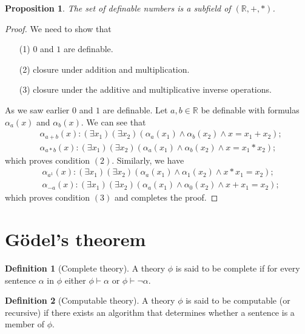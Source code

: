 \documentclass[11pt,a4paper]{article}
\theoremstyle{definition}
\newtheorem{definition}{Definition}[section]
\theoremstyle{plain}
\newtheorem{proposition}[theorem]{Proposition}
\newcommand{\R}{\mathbb{R}}
\begin{document}
  \begin{proposition}
    The set of definable numbers is a subfield of $(\R,+,*)$.
  \end{proposition}
  \begin{proof}
    We need to show that
    \begin{enumerate}
      \item[(1)] $0$ and $1$ are definable.
      \item[(2)] closure under addition and multiplication.
      \item[(3)] closure under the additive and multiplicative 
        inverse operations.
    \end{enumerate}
    As we saw earlier $0$ and $1$ are definable. Let $a,b \in \R$ be definable
    with formulas $\alpha_a(x)$ and $\alpha_b(x)$. We can see that
    \begin{align*}
      &\alpha_{a+b}(x) \colon (\exists x_1)(\exists x_2)
        (\alpha_a(x_1) \land \alpha_b(x_2) \land x = x_1 + x_2); \\
      &\alpha_{a*b}(x) \colon (\exists x_1)(\exists x_2)
        (\alpha_a(x_1) \land \alpha_b(x_2) \land x = x_1 * x_2);
    \end{align*}
    which proves condition $(2)$.
    Similarly, we have
    \begin{align*}
      &\alpha_{a^{1}}(x) \colon (\exists x_1)(\exists x_2)
        (\alpha_a(x_1) \land \alpha_1(x_2) \land x * x_1 = x_2); \\
      &\alpha_{-a}(x) \colon (\exists x_1)(\exists x_2)
        (\alpha_a(x_1) \land \alpha_0(x_2) \land x + x_1 = x_2);
    \end{align*}
    which proves condition $(3)$ and completes the proof.
  \end{proof}

  \section{Gödel's theorem}
  \begin{definition}[Complete theory]
    A theory $\phi$ is said to be complete if for every sentence $\alpha$
    in $\phi$ either $\phi \vdash \alpha$ or $\phi \vdash \neg \alpha$.
  \end{definition}

  \begin{definition}[Computable theory]
    A theory $\phi$ is said to be computable (or recursive) if there 
    exists an algorithm that determines whether a sentence is 
    a member of $\phi$.
  \end{definition}
\end{document}
